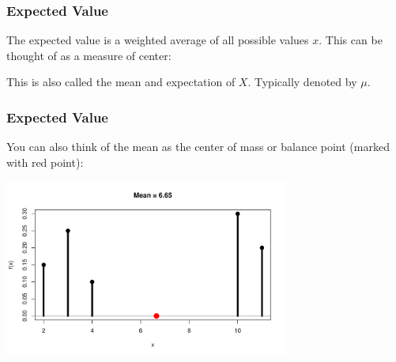 \documentclass[slides]{beamer}
\newcommand{\blue}[1]{\textcolor{blue2}{#1}}
\newcommand{\prob}{\mbox{Pr}}
\newcommand{\E}{\mathbb{E}}
\begin{document}
\begin{frame}
\frametitle{Expected Value}
The \blue{expected value} is a \blue{weighted average} of all possible values $x$.  This can be thought of as a measure of \blue{center}:
\vspace{4cm}


This is also called the \blue{mean} and \blue{expectation} of $X$.  Typically denoted by $\mu$.

\end{frame}






\begin{frame}
\frametitle{Expected Value}
You can also think of the mean as the \blue{center of mass or balance point} (marked with red point):

\begin{center}
\includegraphics[width=0.7\textwidth]{figure/mean}
\end{center}

\end{frame}
\end{document}
